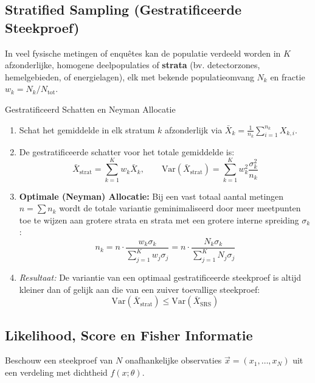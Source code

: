\documentclass[11pt,a4paper]{article}
\newcommand{\Var}{\text{Var}}
\begin{document}
\subsection{Stratified Sampling (Gestratificeerde Steekproef)}
In veel fysische metingen of enquêtes kan de populatie verdeeld worden in $K$ afzonderlijke, homogene deelpopulaties of \textbf{strata} (bv. detectorzones, hemelgebieden, of energielagen), elk met bekende populatieomvang $N_k$ en fractie $w_k = N_k / N_{\text{tot}}$.

\begin{stappenplan}{Gestratificeerd Schatten en Neyman Allocatie}
\begin{enumerate}[leftmargin=1.2em]
    \item Schat het gemiddelde in elk stratum $k$ afzonderlijk via $\bar{X}_k = \frac{1}{n_k}\sum_{i=1}^{n_k} X_{k,i}$.
    \item De gestratificeerde schatter voor het totale gemiddelde is:
    \begin{equation}
        \bar{X}_{\text{strat}} = \sum_{k=1}^K w_k \bar{X}_k, \qquad \Var(\bar{X}_{\text{strat}}) = \sum_{k=1}^K w_k^2 \frac{\sigma_k^2}{n_k}
    \end{equation}
    \item \textbf{Optimale (Neyman) Allocatie:} Bij een vast totaal aantal metingen $n = \sum n_k$ wordt de totale variantie geminimaliseerd door meer meetpunten toe te wijzen aan grotere strata en strata met een grotere interne spreiding $\sigma_k$:
    \begin{equation}
        n_k = n \cdot \frac{w_k \sigma_k}{\sum_{j=1}^K w_j \sigma_j} = n \cdot \frac{N_k \sigma_k}{\sum_{j=1}^K N_j \sigma_j}
    \end{equation}
    \item \emph{Resultaat:} De variantie van een optimaal gestratificeerde steekproef is altijd kleiner dan of gelijk aan die van een zuiver toevallige steekproef:
    \begin{equation}
        \Var(\bar{X}_{\text{strat}}) \le \Var(\bar{X}_{\text{SRS}})
    \end{equation}
\end{enumerate}
\end{stappenplan}

\subsection{Likelihood, Score en Fisher Informatie}
Beschouw een steekproef van $N$ onafhankelijke observaties $\vec{x} = (x_1, \ldots, x_N)$ uit een verdeling met dichtheid $f(x; \theta)$.
\end{document}
